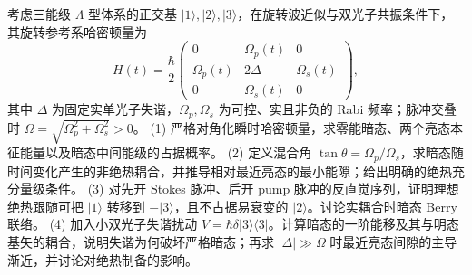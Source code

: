 考虑三能级 \(\Lambda\) 型体系的正交基 \(|1\rangle,|2\rangle,|3\rangle\)，在旋转波近似与双光子共振条件下，其旋转参考系哈密顿量为
\[
H(t)=\frac{\hbar}{2}
\begin{pmatrix}0&\Omega_p(t)&0\\
\Omega_p(t)&2\Delta&\Omega_s(t)\\
0&\Omega_s(t)&0\end{pmatrix},
\]
其中 \(\Delta\) 为固定实单光子失谐，\(\Omega_p,\Omega_s\) 为可控、实且非负的 Rabi 频率；脉冲交叠时 \(\Omega=\sqrt{\Omega_p^2+\Omega_s^2}>0\)。
(1) 严格对角化瞬时哈密顿量，求零能暗态、两个亮态本征能量以及暗态中间能级的占据概率。
(2) 定义混合角 \(\tan\theta=\Omega_p/\Omega_s\)，求暗态随时间变化产生的非绝热耦合，并推导相对最近亮态的最小能隙；给出明确的绝热充分量级条件。
(3) 对先开 Stokes 脉冲、后开 pump 脉冲的反直觉序列，证明理想绝热跟随可把 \(|1\rangle\) 转移到 \(-|3\rangle\)，且不占据易衰变的 \(|2\rangle\)。讨论实耦合时暗态 Berry 联络。
(4) 加入小双光子失谐扰动 \(V=\hbar\delta|3\rangle\langle3|\)。计算暗态的一阶能移及其与明态基矢的耦合，说明失谐为何破坏严格暗态；再求 \(|\Delta|\gg\Omega\) 时最近亮态间隙的主导渐近，并讨论对绝热制备的影响。
